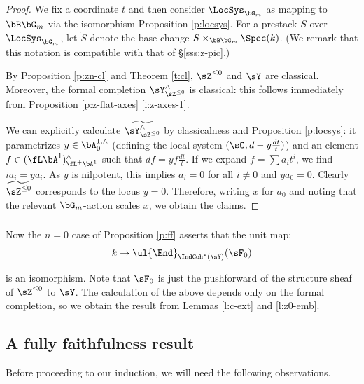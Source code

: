 \begin{proof}

We fix a coordinate $t$ and then consider $\LocSys_{\bG_m}$
as mapping to $\bB \bG_m$ via the isomorphism
Proposition \ref{p:locsys}.
For a prestack $S$ over $\LocSys_{\bG_m}$, let $\widetilde{S}$ denote
the base-change $S \times_{\bB \bG_m} \Spec(k)$. (We remark that this
notation is compatible with that of \S \ref{sss:z-pic}.)

By Proposition \ref{p:zn-cl} and Theorem \ref{t:cl},
$\sZ^{\leq 0}$ and $\sY$ are classical. Moreover, the formal completion
$\sY_{\sZ^{\leq 0}}^{\wedge}$ is classical: this follows immediately
from Proposition \ref{p:z-flat-axes} \eqref{i:z-axes-1}.

We can explicitly calculate $\widetilde{\sY_{\sZ^{\leq 0}}^{\wedge}}$
by classicalness and Proposition \ref{p:locsys}: it parametrizes
$y \in \bA_0^{1,\wedge}$ (defining the local system $(\sO,d-y\frac{dt}{t})$)
and an element $f \in (\fL \bA^1)_{\fL^+ \bA^1}^{\wedge}$
such that $df = y f \frac{dt}{t}$.
If we expand  $f = \sum a_i t^i$, we find $i a_i = y a_i$. As $y$ is
nilpotent, this implies $a_i = 0$ for all $i \neq 0$ and $y a_0 = 0$.
Clearly $\widetilde{\sZ^{\leq 0}}$ corresponds to the locus $y = 0$.
Therefore, writing $x$ for $a_0$ and noting that the relevant $\bG_m$-action
scales $x$, we obtain the claims.

\end{proof}

\subsubsection{}

Now the $n = 0$ case of Proposition \ref{p:ff} asserts that the unit map:
%
\[
k \to \ul{\End}_{\IndCoh^*(\sY)}(\sF_0)
\]

 is an isomorphism. Note that $\sF_0$ is just the pushforward
of the structure sheaf of $\sZ^{\leq 0}$ to $\sY$. The calculation of
the above depends only on the formal completion, so we
obtain the result from Lemmas \ref{l:c-ext} and \ref{l:z0-emb}.

\subsection{A fully faithfulness result}

Before proceeding to our induction, we will need the following observations.

\subsubsection{}

